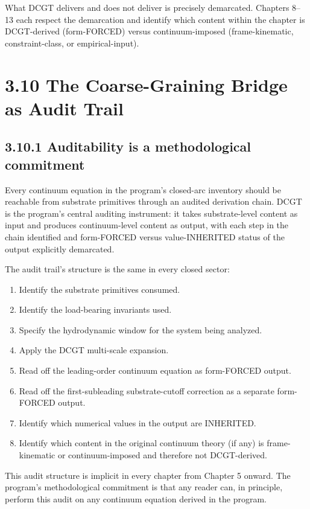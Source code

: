 \documentclass[11pt]{book}
\begin{document}
What DCGT delivers and does not deliver is precisely demarcated. Chapters 8–13 each respect the demarcation and identify which content within the chapter is DCGT-derived (form-FORCED) versus continuum-imposed (frame-kinematic, constraint-class, or empirical-input).

\section{3.10 The Coarse-Graining Bridge as Audit Trail}

\subsection{3.10.1 Auditability is a methodological commitment}

Every continuum equation in the program's closed-arc inventory should be reachable from substrate primitives through an audited derivation chain. DCGT is the program's central auditing instrument: it takes substrate-level content as input and produces continuum-level content as output, with each step in the chain identified and form-FORCED versus value-INHERITED status of the output explicitly demarcated.

The audit trail's structure is the same in every closed sector:
\begin{enumerate}
\item Identify the substrate primitives consumed.
\item Identify the load-bearing invariants used.
\item Specify the hydrodynamic window for the system being analyzed.
\item Apply the DCGT multi-scale expansion.
\item Read off the leading-order continuum equation as form-FORCED output.
\item Read off the first-subleading substrate-cutoff correction as a separate form-FORCED output.
\item Identify which numerical values in the output are INHERITED.
\item Identify which content in the original continuum theory (if any) is frame-kinematic or continuum-imposed and therefore not DCGT-derived.
\end{enumerate}

This audit structure is implicit in every chapter from Chapter 5 onward. The program's methodological commitment is that any reader can, in principle, perform this audit on any continuum equation derived in the program.
\end{document}
